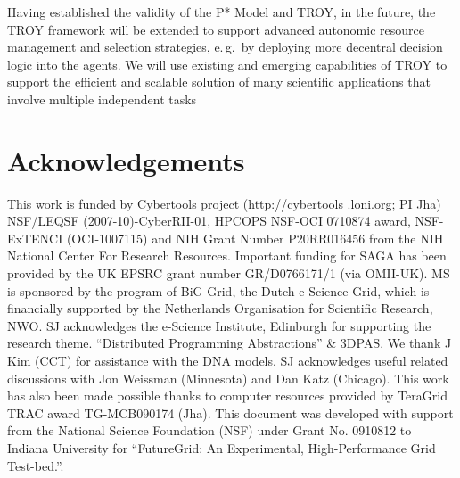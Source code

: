 \documentclass[conference,final]{IEEEtran}
\newcommand{\note}[1]{ {\textcolor{magenta} { ***Note: #1 }}}
\newcommand{\note}[1]{}
\newcommand{\up}{\vspace*{-1em}}
\newcommand{\upp}{\vspace*{-0.5em}}
\begin{document}


Having established the validity of the P* Model and TROY, in the
future, the TROY framework will be extended to support advanced
autonomic resource management and selection strategies, e.\,g.\ by
deploying more decentral decision logic into the agents. We will use
existing and emerging capabilities of TROY to support the efficient
and scalable solution of many scientific applications that involve
multiple independent tasks




\up
\section*{Acknowledgements\upp\upp}
\footnotesize{This work is funded by Cybertools project
  (http://cybertools .loni.org; PI Jha) NSF/LEQSF
  (2007-10)-CyberRII-01, HPCOPS NSF-OCI 0710874 award, NSF-ExTENCI
  (OCI-1007115) and NIH Grant Number P20RR016456 from the NIH National
  Center For Research Resources. Important funding for SAGA has been
  provided by the UK EPSRC grant number GR/D0766171/1 (via OMII-UK).
  MS is sponsored by the program of BiG Grid, the Dutch e-Science
  Grid, which is financially supported by the Netherlands Organisation
  for Scientific Research, NWO. SJ acknowledges the e-Science
  Institute, Edinburgh for supporting the research
  theme. ``Distributed Programming Abstractions'' \& 3DPAS. We thank J
  Kim (CCT) for assistance with the DNA models.  SJ acknowledges
  useful related discussions with Jon Weissman (Minnesota) and Dan
  Katz (Chicago). This work has also been made possible thanks to
  computer resources provided by TeraGrid TRAC award TG-MCB090174
  (Jha). This document was developed with support from the National
  Science Foundation (NSF) under Grant No.  0910812 to Indiana
  University for ``FutureGrid: An Experimental, High-Performance Grid
  Test-bed.''.}

\up


\end{document}
